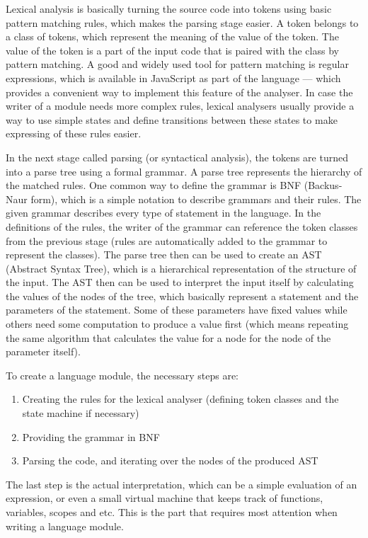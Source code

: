 Lexical analysis is basically turning the source code into tokens using basic pattern matching rules, which makes the parsing stage easier. A token belongs to a class of tokens, which represent the meaning of the value of the token. The value of the token is a part of the input code that is paired with the class by pattern matching. A good and widely used tool for pattern matching is regular expressions, which is available in JavaScript as part of the language --- which provides a convenient way to implement this feature of the analyser. In case the writer of a module needs more complex rules, lexical analysers usually provide a way to use simple states and define transitions between these states to make expressing of these rules easier.

In the next stage called parsing (or syntactical analysis), the tokens are turned into a parse tree using a formal grammar. A parse tree represents the hierarchy of the matched rules. One common way to define the grammar is BNF (Backus-Naur form), which is a simple notation to describe grammars and their rules. The given grammar describes every type of statement in the language. In the definitions of the rules, the writer of the grammar can reference the token classes from the previous stage (rules are automatically added to the grammar to represent the classes). The parse tree then can be used to create an AST (Abstract Syntax Tree), which is a hierarchical representation of the structure of the input. The AST then can be used to interpret the input itself by calculating the values of the nodes of the tree, which basically represent a statement and the parameters of the statement. Some of these parameters have fixed values while others need some computation to produce a value first (which means repeating the same algorithm that calculates the value for a node for the node of the parameter itself).

To create a language module, the necessary steps are:
\begin{enumerate}
\item Creating the rules for the lexical analyser (defining token classes and the state machine if necessary)
\item Providing the grammar in BNF
\item Parsing the code, and iterating over the nodes of the produced AST
\end{enumerate}
The last step is the actual interpretation, which can be a simple evaluation of an expression, or even a small virtual machine that keeps track of functions, variables, scopes and etc. This is the part that requires most attention when writing a language module.

